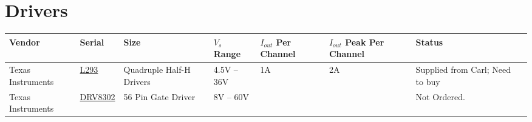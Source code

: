 \documentclass[a4paper,landscape]{article}
\begin{document}
\section{Drivers}
    {\footnotesize
    \hspace*{-6cm}\begin{tabular}{llllllll}
    \rowcolor{gray!50}
    \hline
    \textbf{Vendor}
    & \textbf{Serial}
    & \textbf{Size}
    & \textbf{$V_{s}$ Range}
    & \textbf{$I_{out}$ Per Channel}
    & \textbf{$I_{out}$ Peak Per Channel}
    & \textbf{Status}\\
    \hline
    Texas Instruments
    & \href{http://www.ti.com/lit/ds/symlink/l293d.pdf}{L293}
    & Quadruple Half-H Drivers
    & 4.5V -- 36V
    & 1A
    & 2A
    & Supplied from Carl; Need to buy\\
    Texas Instruments
    & \href{http://www.ti.com/lit/ds/symlink/drv8302.pdf}{DRV8302}
    & 56 Pin Gate Driver
    & 8V -- 60V
    &
    &
    & Not Ordered.\\
  \hline
  \end{tabular}}
\end{document}
